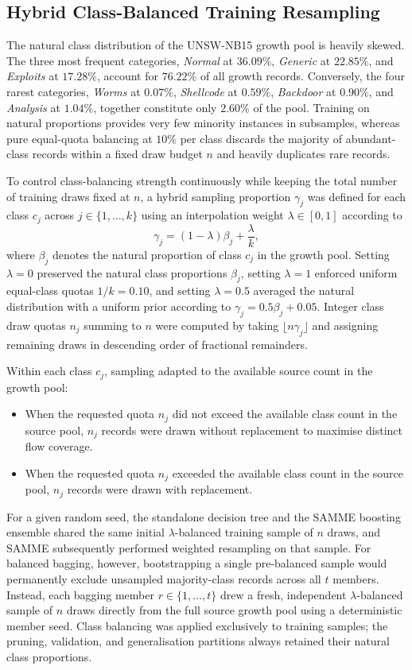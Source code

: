 \subsection{Hybrid Class-Balanced Training Resampling}
\label{subsec:meth_balance}
The natural class distribution of the UNSW-NB15 growth pool is heavily skewed. The three most frequent categories, \emph{Normal} at $36.09\%$, \emph{Generic} at $22.85\%$, and \emph{Exploits} at $17.28\%$, account for $76.22\%$ of all growth records. Conversely, the four rarest categories, \emph{Worms} at $0.07\%$, \emph{Shellcode} at $0.59\%$, \emph{Backdoor} at $0.90\%$, and \emph{Analysis} at $1.04\%$, together constitute only $2.60\%$ of the pool. Training on natural proportions provides very few minority instances in subsamples, whereas pure equal-quota balancing at $10\%$ per class discards the majority of abundant-class records within a fixed draw budget $n$ and heavily duplicates rare records.

To control class-balancing strength continuously while keeping the total number of training draws fixed at $n$, a hybrid sampling proportion $\gamma_j$ was defined for each class $c_j$ across $j \in \{1, \dots, k\}$ using an interpolation weight $\lambda \in [0, 1]$ according to
\begin{equation}
    \gamma_j = (1 - \lambda)\beta_j + \frac{\lambda}{k},
    \label{eq:hybrid_balance}
\end{equation}
where $\beta_j$ denotes the natural proportion of class $c_j$ in the growth pool. Setting $\lambda = 0$ preserved the natural class proportions $\beta_j$, setting $\lambda = 1$ enforced uniform equal-class quotas $1/k = 0.10$, and setting $\lambda = 0.5$ averaged the natural distribution with a uniform prior according to $\gamma_j = 0.5\beta_j + 0.05$. Integer class draw quotas $n_j$ summing to $n$ were computed by taking $\lfloor n \gamma_j \rfloor$ and assigning remaining draws in descending order of fractional remainders.

Within each class $c_j$, sampling adapted to the available source count in the growth pool:
\begin{itemize}
    \item When the requested quota $n_j$ did not exceed the available class count in the source pool, $n_j$ records were drawn without replacement to maximise distinct flow coverage.
    \item When the requested quota $n_j$ exceeded the available class count in the source pool, $n_j$ records were drawn with replacement.
\end{itemize}
For a given random seed, the standalone decision tree and the SAMME boosting ensemble shared the same initial $\lambda$-balanced training sample of $n$ draws, and SAMME subsequently performed weighted resampling on that sample. For balanced bagging, however, bootstrapping a single pre-balanced sample would permanently exclude unsampled majority-class records across all $t$ members. Instead, each bagging member $r \in \{1, \dots, t\}$ drew a fresh, independent $\lambda$-balanced sample of $n$ draws directly from the full source growth pool using a deterministic member seed. Class balancing was applied exclusively to training samples; the pruning, validation, and generalisation partitions always retained their natural class proportions.

